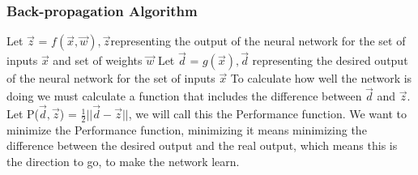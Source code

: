 \documentclass[11pt]{article}
\begin{document}
\subsubsection{Back-propagation Algorithm}
\label{sec:back}
Let $\overrightarrow{z}$ = $f(\overrightarrow{x}, \overrightarrow{w}), \overrightarrow{z}$representing the output of the neural network for the set of inputs $\overrightarrow{x}$ and set of weights $\overrightarrow{w}$
Let $\overrightarrow{d}$ = $g(\overrightarrow{x}), \overrightarrow{d}$ representing the desired output of the neural network for the set of inputs $\overrightarrow{x}$
To calculate how well the network is doing we must calculate a function that includes the difference between $\overrightarrow{d}$ and $\overrightarrow{z}$.
Let P($\overrightarrow{d}, \overrightarrow{z}$) = $\frac{1}{2} || \overrightarrow{d} -  \overrightarrow{z} ||$, we will call this the Performance function.
\hfill \break
\hfill \break
We want to minimize the Performance function, minimizing it means minimizing the difference between the desired output and the real output, which means this is the direction to go, to make the network learn.
\end{document}

